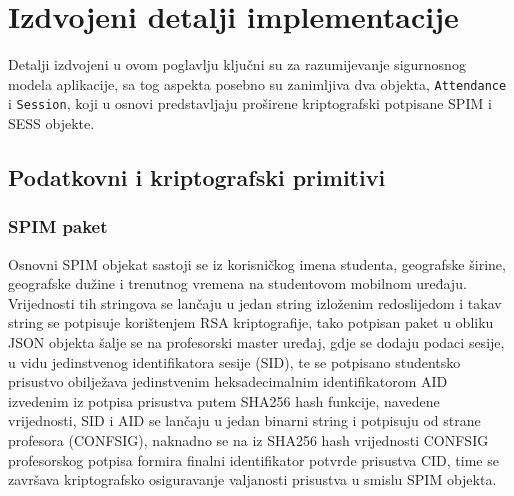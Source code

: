 \chapter{Izdvojeni detalji implementacije}
Detalji izdvojeni u ovom poglavlju ključni su za razumijevanje sigurnosnog modela aplikacije, sa tog aspekta posebno su zanimljiva dva objekta, \texttt{Attendance} i \texttt{Session}, koji u osnovi predstavljaju proširene kriptografski potpisane SPIM i SESS objekte.
\section{Podatkovni i kriptografski primitivi}
\subsection{SPIM paket}
Osnovni SPIM objekat sastoji se iz korisničkog imena studenta, geografske širine, geografske dužine i trenutnog vremena na studentovom mobilnom uređaju. Vrijednosti tih stringova se lančaju u jedan string izloženim redoslijedom i takav string se potpisuje korištenjem RSA kriptografije, tako potpisan paket u obliku JSON objekta šalje se na profesorski master uređaj, gdje se dodaju podaci sesije, u vidu jedinstvenog identifikatora sesije (SID), te se potpisano studentsko prisustvo obilježava jedinstvenim heksadecimalnim identifikatorom AID izvedenim iz potpisa prisustva putem SHA256 hash funkcije, navedene vrijednosti, SID i AID se lančaju u jedan binarni string i potpisuju od strane profesora (CONFSIG), naknadno se na iz SHA256 hash vrijednosti CONFSIG profesorskog potpisa formira finalni identifikator potvrde prisustva CID, time se završava kriptografsko osiguravanje valjanosti prisustva u smislu SPIM objekta.


